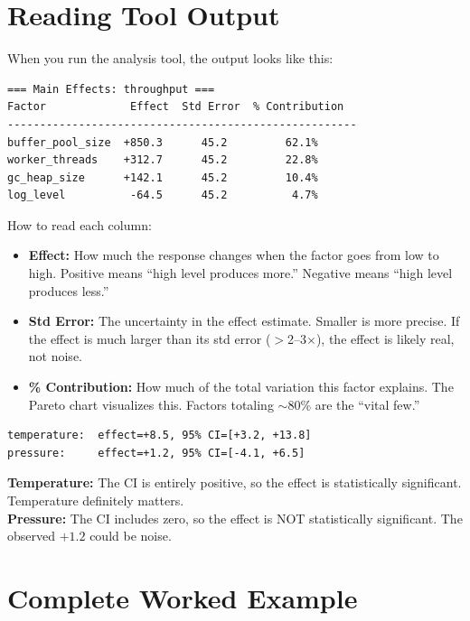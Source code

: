 \documentclass[11pt]{book}
\begin{document}
\section{Reading Tool Output}

When you run the analysis tool, the output looks like this:

\begin{lstlisting}[basicstyle=\footnotesize\ttfamily]
=== Main Effects: throughput ===
Factor             Effect  Std Error  % Contribution
------------------------------------------------------
buffer_pool_size  +850.3      45.2         62.1%
worker_threads    +312.7      45.2         22.8%
gc_heap_size      +142.1      45.2         10.4%
log_level          -64.5      45.2          4.7%
\end{lstlisting}

\noindent How to read each column:
\begin{itemize}[nosep]
\item \textbf{Effect:} How much the response changes when the factor goes from
      low to high. Positive means ``high level produces more.'' Negative means
      ``high level produces less.''
\item \textbf{Std Error:} The uncertainty in the effect estimate. Smaller is
      more precise. If the effect is much larger than its std error ($>$2--3$\times$),
      the effect is likely real, not noise.
\item \textbf{\% Contribution:} How much of the total variation this factor
      explains. The Pareto chart visualizes this. Factors totaling $\sim$80\%
      are the ``vital few.''
\end{itemize}

\begin{example}
\begin{lstlisting}[basicstyle=\footnotesize\ttfamily]
temperature:  effect=+8.5, 95% CI=[+3.2, +13.8]
pressure:     effect=+1.2, 95% CI=[-4.1, +6.5]
\end{lstlisting}
\textbf{Temperature:} The CI is entirely positive, so the effect is
statistically significant. Temperature definitely matters.\\
\textbf{Pressure:} The CI includes zero, so the effect is NOT statistically
significant. The observed $+1.2$ could be noise.
\end{example}

\section{Complete Worked Example}
\end{document}
